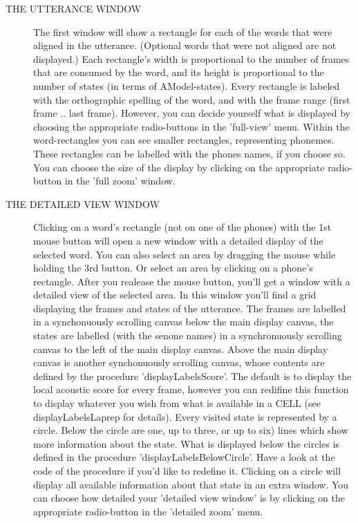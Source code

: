         \begin{description}
	\item[THE UTTERANCE WINDOW]

	The first window will show a rectangle for each of the words that were
	aligned in the utterance. (Optional words that were not aligned are
	not displayed.) Each rectangle's width is proportional to the number
	of frames that are consumed by the word, and its height is proportional
	to the number of states (in terms of AModel-states). Every rectangle is
	labeled with the orthographic spelling of the word, and with the frame
	range (first frame .. last frame). However, you can decide yourself
	what is displayed by choosing the appropriate radio-buttons in the
        'full-view' menu.
	Within the word-rectangles you can see smaller rectangles, representing
	phonemes. These rectangles can be labelled with the phones names, if
        you choose so.
	You can choose the size of the display by clicking on the appropriate
	radio-button in the 'full zoom' window.

	\item[THE DETAILED VIEW WINDOW]

	Clicking on a word's rectangle (not on one of the phones) with the 1st
	mouse button will open a new window with a detailed display of the 
	selected word. You can also select an area by dragging the mouse while 
	holding the 3rd button. Or select an area by clicking on a phone's
        rectangle. After you realease the mouse button, you'll get
	a window with a detailed view of the selected area.
	In this window you'll find a grid displaying the frames and states
	of the utterance. The frames are labelled in a synchonuously scrolling
        canvas below the main display canvas, the states are labelled (with the
	senone names) in a synchronuously scrolling canvas to the left of the
	main display canvas. Above the main display canvas is another
	synchonuously scrolling canvas, whose contents are defined by the
	procedure 'displayLabelsScore'. The default is to display the local
	acoustic score for every frame, however you can redifine this function
	to display whatever you wish from what is available in a CELL (see
	displayLabelsLaprep for details). Every visited state is represented
	by a circle. Below the circle are one, up to three, or up to six) lines
	which show more information about the state. What is displayed below
	the circles is defined in the procedure 'displayLabelsBelowCircle'.
	Have a look at the code of the procedure if you'd like to redefine it.
	Clicking on a circle will display all available information about that
	state in an extra window.
	You can choose how detailed your 'detailed view window' is by clicking
	on the appropriate radio-button in the 'detailed zoom' menu.
	\end{description}

